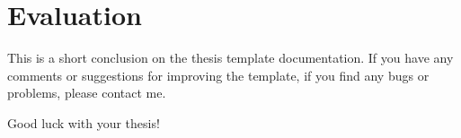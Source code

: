 \chapter{Evaluation}
This is a short conclusion on the thesis template documentation. If you have any comments or suggestions for improving the template, if you find any bugs or problems, please contact me. 

\vspace{2cm}

Good luck with your thesis!
